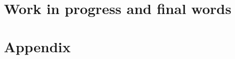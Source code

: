 
\part{Work in progress and final words}


\cleardoublepage


\appendix

\part{Appendix}


\cleardoublepage

\cleardoublepage

\cleardoublepage

\clearpage





